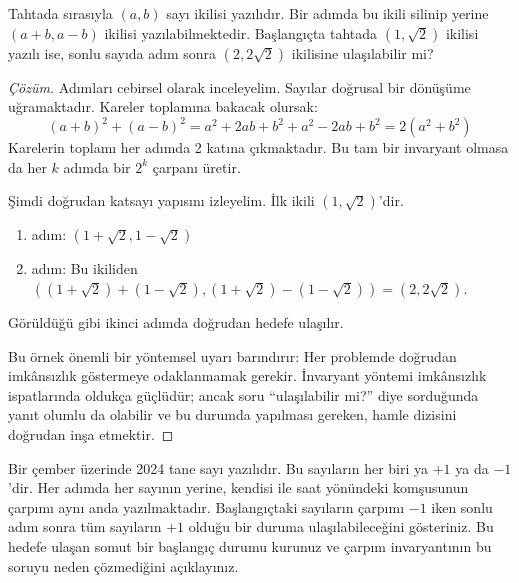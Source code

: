 \begin{example}
Tahtada sırasıyla $(a, b)$ sayı ikilisi yazılıdır. Bir adımda bu ikili silinip yerine $(a+b, a-b)$ ikilisi yazılabilmektedir. Başlangıçta tahtada $(1, \sqrt{2})$ ikilisi yazılı ise, sonlu sayıda adım sonra $(2, 2\sqrt{2})$ ikilisine ulaşılabilir mi?
\end{example}

\begin{proof}[Çözüm]
Adımları cebirsel olarak inceleyelim. Sayılar doğrusal bir dönüşüme uğramaktadır. Kareler toplamına bakacak olursak:
\[
(a+b)^2 + (a-b)^2 = a^2 + 2ab + b^2 + a^2 - 2ab + b^2 = 2(a^2 + b^2)
\]
Karelerin toplamı her adımda 2 katına çıkmaktadır. Bu tam bir invaryant olmasa da her $k$ adımda bir $2^k$ çarpanı üretir.

Şimdi doğrudan katsayı yapısını izleyelim. İlk ikili $(1, \sqrt{2})$'dir.
\begin{enumerate}
    \item adım: $(1 + \sqrt{2}, 1 - \sqrt{2})$
    \item adım: Bu ikiliden $((1+\sqrt{2}) + (1-\sqrt{2}), (1+\sqrt{2}) - (1-\sqrt{2})) = (2, 2\sqrt{2})$.
\end{enumerate}

Görüldüğü gibi ikinci adımda doğrudan hedefe ulaşılır. 

Bu örnek önemli bir yöntemsel uyarı barındırır: Her problemde doğrudan imkânsızlık göstermeye odaklanmamak gerekir. İnvaryant yöntemi imkânsızlık ispatlarında oldukça güçlüdür; ancak soru ``ulaşılabilir mi?'' diye sorduğunda yanıt olumlu da olabilir ve bu durumda yapılması gereken, hamle dizisini doğrudan inşa etmektir.
\end{proof}

\begin{example}
Bir çember üzerinde 2024 tane sayı yazılıdır. Bu sayıların her biri ya $+1$ ya da $-1$'dir. Her adımda her sayının yerine, kendisi ile saat yönündeki komşusunun çarpımı aynı anda yazılmaktadır. Başlangıçtaki sayıların çarpımı $-1$ iken sonlu adım sonra tüm sayıların $+1$ olduğu bir duruma ulaşılabileceğini gösteriniz. Bu hedefe ulaşan somut bir başlangıç durumu kurunuz ve çarpım invaryantının bu soruyu neden çözmediğini açıklayınız.
\end{example}

